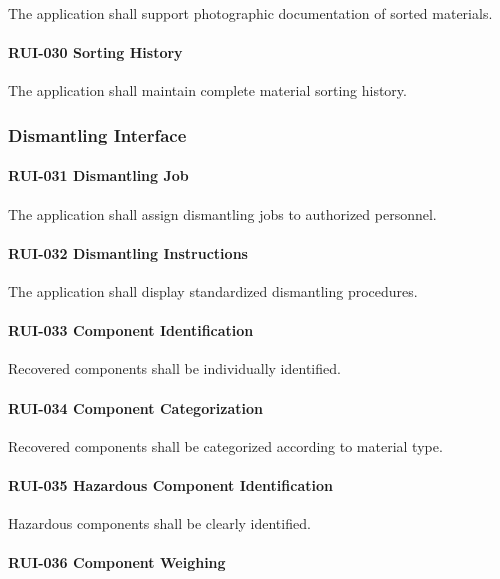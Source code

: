 The application shall support photographic documentation of sorted
materials.

\paragraph{RUI-030 Sorting History}

The application shall maintain complete material sorting history.


\subsubsection*{Dismantling Interface}

\paragraph{RUI-031 Dismantling Job}

The application shall assign dismantling jobs to authorized personnel.

\paragraph{RUI-032 Dismantling Instructions}

The application shall display standardized dismantling procedures.

\paragraph{RUI-033 Component Identification}

Recovered components shall be individually identified.

\paragraph{RUI-034 Component Categorization}

Recovered components shall be categorized according to material type.

\paragraph{RUI-035 Hazardous Component Identification}

Hazardous components shall be clearly identified.

\paragraph{RUI-036 Component Weighing}

